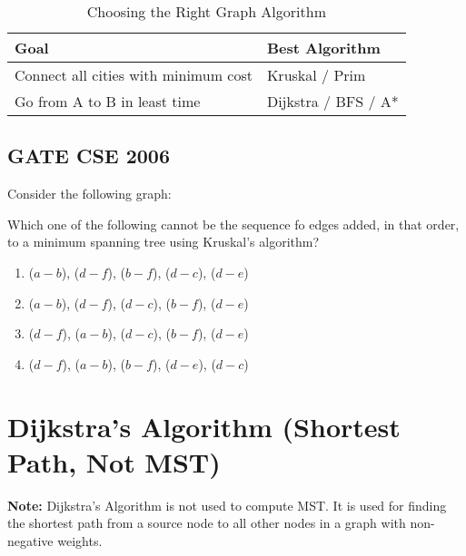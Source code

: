 \documentclass[a4paper,14pt]{extarticle}
\renewcommand{\arraystretch}{1.3}
\begin{document}
\begin{table}[H]
\centering
\renewcommand{\arraystretch}{1.3}
\begin{tabular}{|l|l|}
\hline
\textbf{Goal} & \textbf{Best Algorithm} \\
\hline
Connect all cities with minimum cost & Kruskal / Prim \\
Go from A to B in least time & Dijkstra / BFS / A* \\
\hline
\end{tabular}
\caption{Choosing the Right Graph Algorithm}
\end{table}


\newpage
\subsection{GATE CSE 2006}
Consider the following graph:



Which one of the following cannot be the sequence fo edges added, in that
order, to a minimum spanning tree using Kruskal's algorithm?

\begin{enumerate}[label=(\alph*)]
    \item ($a - b$), ($d - f$), ($b - f$), ($d - c$), ($d - e$)
    \item ($a - b$), ($d - f$), ($d - c$), ($b - f$), ($d - e$)
    \item ($d - f$), ($a - b$), ($d - c$), ($b - f$), ($d - e$)
    \item ($d - f$), ($a - b$), ($b - f$), ($d - e$), ($d - c$)
\end{enumerate}


\newpage
\section{Dijkstra's Algorithm (Shortest Path, Not MST)}

\textbf{Note:} Dijkstra's Algorithm is not used to compute MST. It is used for finding the shortest path from a source node to all other nodes in a graph with non-negative weights.
\end{document}
